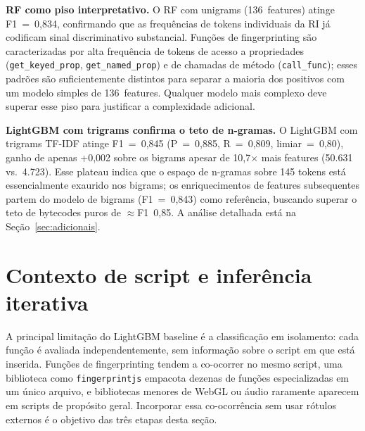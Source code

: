 \textbf{RF como piso interpretativo.} O RF com unigrams (136~features) atinge
F1~=~0,834, confirmando que as frequências de tokens individuais da RI já codificam
sinal discriminativo substancial. Funções de fingerprinting são
caracterizadas por alta frequência de tokens de acesso a propriedades
(\texttt{get\_keyed\_prop}, \texttt{get\_named\_prop}) e de chamadas de método
(\texttt{call\_func}); esses padrões são suficientemente distintos para separar a
maioria dos positivos com um modelo simples de 136~features. Qualquer modelo mais
complexo deve superar esse piso para justificar a complexidade adicional.

\textbf{LightGBM com trigrams confirma o teto de n-gramas.} O LightGBM com trigrams
TF-IDF atinge F1~=~0,845 (P~=~0,885, R~=~0,809, limiar~=~0,80), ganho de apenas +0,002
sobre os bigrams apesar de 10,7$\times$ mais features (50.631 vs.\ 4.723). Esse plateau
indica que o espaço de n-gramas sobre 145 tokens está essencialmente exaurido nos bigrams;
os enriquecimentos de features subsequentes partem do modelo de bigrams (F1~=~0,843) como
referência, buscando superar o teto de bytecodes puros de $\approx$F1~0,85. A análise
detalhada está na Seção~\ref{sec:adicionais}.

\section{Contexto de script e inferência iterativa}
\label{sec:iterativo}

A principal limitação do LightGBM baseline é a classificação em isolamento: cada
função é avaliada independentemente, sem informação sobre o script em que está
inserida. Funções de fingerprinting tendem a co-ocorrer no mesmo script, uma biblioteca como \texttt{fingerprintjs} empacota dezenas de funções
especializadas em um único arquivo, e bibliotecas menores de WebGL ou áudio
raramente aparecem em scripts de propósito geral. Incorporar essa co-ocorrência sem
usar rótulos externos é o objetivo das três etapas desta seção.

